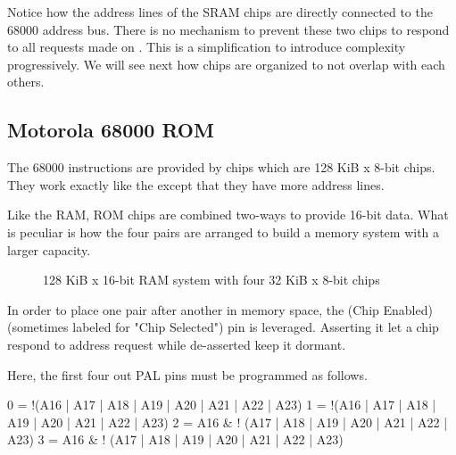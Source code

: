 Notice how the address lines of the SRAM chips are directly connected to the 68000 address bus. There is no mechanism to prevent these two chips to respond to all requests made on \icode{[0x**0000-0x**8000]}. This is a simplification to introduce complexity progressively. We will see next how chips are organized to not overlap with each others.









\subsection{Motorola 68000 ROM}


The 68000 instructions are provided by  chips which are 128 KiB x 8-bit chips. They work exactly like the  except that they have more address lines.

Like the RAM, ROM chips are combined two-ways to provide 16-bit data. What is peculiar is how the four pairs are arranged to build a memory system with a larger capacity.


\begin{figure}[H]
\caption*{128 KiB x 16-bit RAM system with four 32 KiB x 8-bit chips}
\end{figure}

In order to place one pair after another in memory space, the  (Chip Enabled) (sometimes labeled  for "Chip Selected") pin is leveraged. Asserting it let a chip respond to address request while de-asserted keep it dormant.

Here, the first four out PAL pins must be programmed as follows.

\begin{code}
0 = !(A16  | A17 | A18 | A19 | A20 | A21 | A22 | A23)  
1 = !(A16  | A17 | A18 | A19 | A20 | A21 | A22 | A23)  
2 = A16 & ! (A17 | A18 | A19 | A20 | A21 | A22 | A23)  
3 = A16 & ! (A17 | A18 | A19 | A20 | A21 | A22 | A23)  
\end{code}

